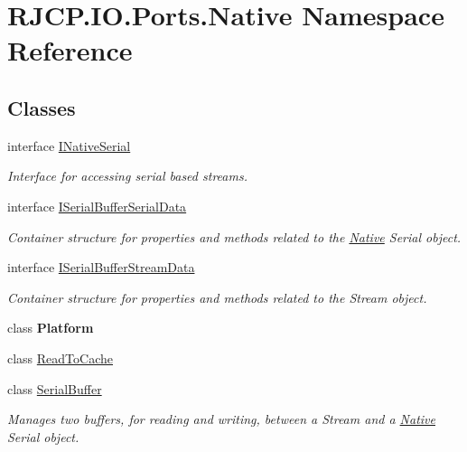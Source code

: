 \hypertarget{namespace_r_j_c_p_1_1_i_o_1_1_ports_1_1_native}{}\section{R\+J\+C\+P.\+I\+O.\+Ports.\+Native Namespace Reference}
\label{namespace_r_j_c_p_1_1_i_o_1_1_ports_1_1_native}
\subsection*{Classes}
\begin{DoxyCompactItemize}
\item 
interface \mbox{\hyperlink{interface_r_j_c_p_1_1_i_o_1_1_ports_1_1_native_1_1_i_native_serial}{I\+Native\+Serial}}
\begin{DoxyCompactList}\small\item\em Interface for accessing serial based streams. \end{DoxyCompactList}\item 
interface \mbox{\hyperlink{interface_r_j_c_p_1_1_i_o_1_1_ports_1_1_native_1_1_i_serial_buffer_serial_data}{I\+Serial\+Buffer\+Serial\+Data}}
\begin{DoxyCompactList}\small\item\em Container structure for properties and methods related to the \mbox{\hyperlink{namespace_r_j_c_p_1_1_i_o_1_1_ports_1_1_native}{Native}} Serial object. \end{DoxyCompactList}\item 
interface \mbox{\hyperlink{interface_r_j_c_p_1_1_i_o_1_1_ports_1_1_native_1_1_i_serial_buffer_stream_data}{I\+Serial\+Buffer\+Stream\+Data}}
\begin{DoxyCompactList}\small\item\em Container structure for properties and methods related to the Stream object. \end{DoxyCompactList}\item 
class {\bfseries Platform}
\item 
class \mbox{\hyperlink{class_r_j_c_p_1_1_i_o_1_1_ports_1_1_native_1_1_read_to_cache}{Read\+To\+Cache}}
\item 
class \mbox{\hyperlink{class_r_j_c_p_1_1_i_o_1_1_ports_1_1_native_1_1_serial_buffer}{Serial\+Buffer}}
\begin{DoxyCompactList}\small\item\em Manages two buffers, for reading and writing, between a Stream and a \mbox{\hyperlink{namespace_r_j_c_p_1_1_i_o_1_1_ports_1_1_native}{Native}} Serial object. \end{DoxyCompactList}\item 

\end{DoxyCompactItemize}
